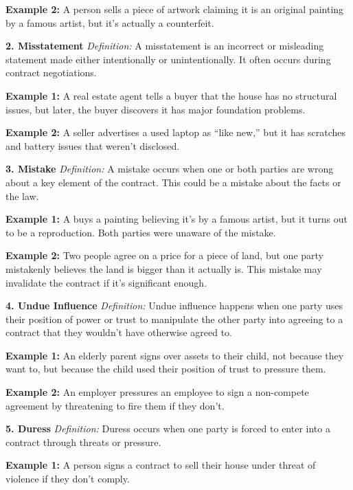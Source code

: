 \documentclass[12pt,a4paper]{book}
\begin{document}
\textbf{Example 2:}  
A person sells a piece of artwork claiming it is an original painting by a famous artist, but it's actually a counterfeit.

\vspace{0.5cm}
\textbf{2. Misstatement}  
\textit{Definition:} A misstatement is an incorrect or misleading statement made either intentionally or unintentionally. It often occurs during contract negotiations.  

\textbf{Example 1:}  
A real estate agent tells a buyer that the house has no structural issues, but later, the buyer discovers it has major foundation problems.

\textbf{Example 2:}  
A seller advertises a used laptop as “like new,” but it has scratches and battery issues that weren’t disclosed.

\vspace{0.5cm}
\textbf{3. Mistake}  
\textit{Definition:} A mistake occurs when one or both parties are wrong about a key element of the contract. This could be a mistake about the facts or the law.  

\textbf{Example 1:}  
A buys a painting believing it's by a famous artist, but it turns out to be a reproduction. Both parties were unaware of the mistake.

\textbf{Example 2:}  
Two people agree on a price for a piece of land, but one party mistakenly believes the land is bigger than it actually is. This mistake may invalidate the contract if it’s significant enough.

\vspace{0.5cm}
\textbf{4. Undue Influence}  
\textit{Definition:} Undue influence happens when one party uses their position of power or trust to manipulate the other party into agreeing to a contract that they wouldn't have otherwise agreed to.  

\textbf{Example 1:}  
An elderly parent signs over assets to their child, not because they want to, but because the child used their position of trust to pressure them.

\textbf{Example 2:}  
An employer pressures an employee to sign a non-compete agreement by threatening to fire them if they don’t.

\vspace{0.5cm}
\textbf{5. Duress}  
\textit{Definition:} Duress occurs when one party is forced to enter into a contract through threats or pressure.  

\textbf{Example 1:}  
A person signs a contract to sell their house under threat of violence if they don't comply.
\end{document}
